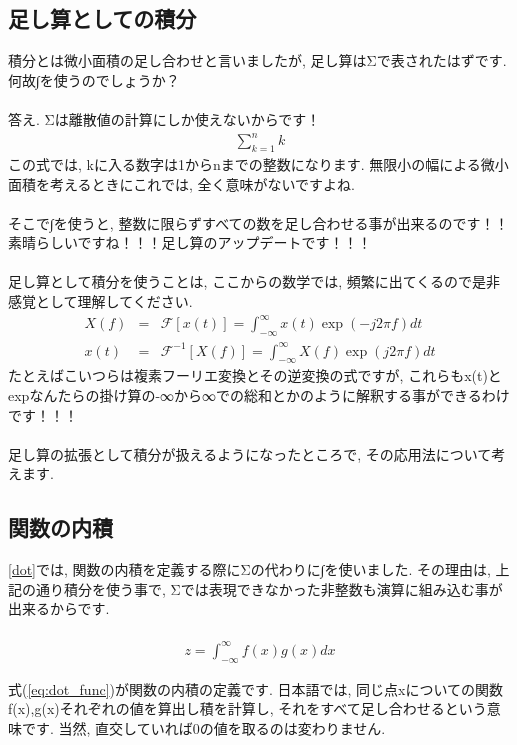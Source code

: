 \documentclass[11pt,a4paper]{jreport}
\begin{document}
\subsection{足し算としての積分}
積分とは微小面積の足し合わせと言いましたが, 足し算はΣで表されたはずです. 何故∫を使うのでしょうか？\\
\\
答え. Σは離散値の計算にしか使えないからです！\\
\begin{eqnarray}
\sum_{k=1}^{n} k
\end{eqnarray}
この式では, kに入る数字は1からnまでの整数になります. 無限小の幅による微小面積を考えるときにこれでは, 全く意味がないですよね.\\
\\
そこで∫を使うと, 整数に限らずすべての数を足し合わせる事が出来るのです！！\\
素晴らしいですね！！！足し算のアップデートです！！！\\
\\
足し算として積分を使うことは, ここからの数学では, 頻繁に出てくるので是非感覚として理解してください.
\begin{eqnarray}
X(f) &=& \mathcal{F}[x(t)] = \int^{\infty}_{-\infty}x(t)\exp(-j2\pi f)dt \\
 x(t) &=& \mathcal{F}^{-1}[X(f)] = \int^{\infty}_{-\infty}X(f)\exp(j2\pi f)dt 
\end{eqnarray}
たとえばこいつらは複素フーリエ変換とその逆変換の式ですが, これらもx(t)とexpなんたらの掛け算の-∞から∞での総和とかのように解釈する事ができるわけです！！！\\
\\
足し算の拡張として積分が扱えるようになったところで, その応用法について考えます. 
\subsection{関数の内積 \label{dot_func}}
\ref{dot}では, 関数の内積を定義する際にΣの代わりに∫を使いました. その理由は, 上記の通り積分を使う事で, Σでは表現できなかった非整数も演算に組み込む事が出来るからです.\\
\\

\begin{eqnarray}
\label{eq:dot_func}
z = \int^{\infty}_{-\infty} f(x)g(x)dx
\end{eqnarray}

式(\ref{eq:dot_func})が関数の内積の定義です. 日本語では, 同じ点xについての関数f(x),g(x)それぞれの値を算出し積を計算し, それをすべて足し合わせるという意味です. 当然, 直交していれば0の値を取るのは変わりません.
\end{document}
